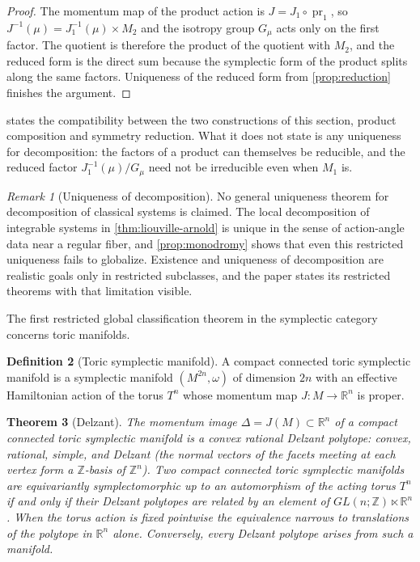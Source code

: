 \documentclass[11pt,letterpaper]{article}
\newtheorem{theorem}{Theorem}[section]
\theoremstyle{definition}
\newtheorem{definition}[theorem]{Definition}
\theoremstyle{remark}
\newtheorem{remark}[theorem]{Remark}
\begin{document}
\begin{proof}
The momentum map of the product action is $J = J_1 \circ \operatorname{pr}_1$, so $J^{-1}(\mu) = J_1^{-1}(\mu) \times M_2$ and the isotropy group $G_{\mu}$ acts only on the first factor. The quotient is therefore the product of the quotient with $M_2$, and the reduced form is the direct sum because the symplectic form of the product splits along the same factors. Uniqueness of the reduced form from \cref{prop:reduction} finishes the argument.
\end{proof}

 states the compatibility between the two constructions of this section, product composition and symmetry reduction. What it does not state is any uniqueness for decomposition: the factors of a product can themselves be reducible, and the reduced factor $J_1^{-1}(\mu) / G_{\mu}$ need not be irreducible even when $M_1$ is.

\begin{remark}[Uniqueness of decomposition]
\label{rem:uniqueness}
No general uniqueness theorem for decomposition of classical systems is claimed. The local decomposition of integrable systems in \cref{thm:liouville-arnold} is unique in the sense of action-angle data near a regular fiber, and \cref{prop:monodromy} shows that even this restricted uniqueness fails to globalize. Existence and uniqueness of decomposition are realistic goals only in restricted subclasses, and the paper states its restricted theorems with that limitation visible.
\end{remark}

The first restricted global classification theorem in the symplectic category concerns toric manifolds.

\begin{definition}[Toric symplectic manifold]
\label{def:toric}
A compact connected toric symplectic manifold is a symplectic manifold $(M^{2n}, \omega)$ of dimension $2n$ with an effective Hamiltonian action of the torus $T^{n}$ whose momentum map $J : M \to \mathbb{R}^{n}$ is proper.
\end{definition}

\begin{theorem}[Delzant]
\label{thm:delzant}
The momentum image $\Delta = J(M) \subset \mathbb{R}^{n}$ of a compact connected toric symplectic manifold is a convex rational Delzant polytope: convex, rational, simple, and Delzant (the normal vectors of the facets meeting at each vertex form a $\mathbb{Z}$-basis of $\mathbb{Z}^{n}$). Two compact connected toric symplectic manifolds are equivariantly symplectomorphic up to an automorphism of the acting torus $T^{n}$ if and only if their Delzant polytopes are related by an element of $GL(n; \mathbb{Z}) \ltimes \mathbb{R}^{n}$. When the torus action is fixed pointwise the equivalence narrows to translations of the polytope in $\mathbb{R}^{n}$ alone. Conversely, every Delzant polytope arises from such a manifold.
\end{theorem}
\end{document}
